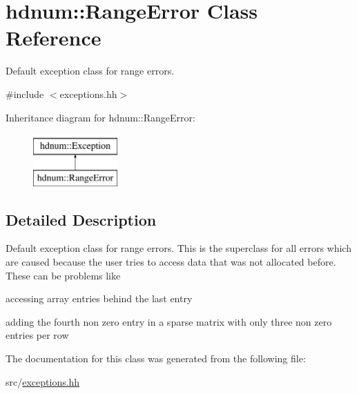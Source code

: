 \hypertarget{classhdnum_1_1RangeError}{
\section{hdnum::RangeError Class Reference}
\label{classhdnum_1_1RangeError}
}


Default exception class for range errors.  




{\ttfamily \#include $<$exceptions.hh$>$}

Inheritance diagram for hdnum::RangeError:\begin{figure}[H]
\begin{center}
\leavevmode
\includegraphics[height=2cm]{classhdnum_1_1RangeError}
\end{center}
\end{figure}


\subsection{Detailed Description}
Default exception class for range errors. This is the superclass for all errors which are caused because the user tries to access data that was not allocated before. These can be problems like


\begin{DoxyItemize}
\item accessing array entries behind the last entry
\item adding the fourth non zero entry in a sparse matrix with only three non zero entries per row 
\end{DoxyItemize}

The documentation for this class was generated from the following file:\begin{DoxyCompactItemize}
\item 
src/\hyperlink{exceptions_8hh}{exceptions.hh}\end{DoxyCompactItemize}

